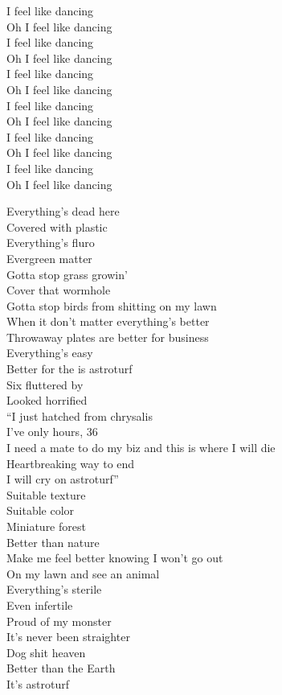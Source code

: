 I feel like dancing \\
Oh I feel like dancing \\
I feel like dancing \\
Oh I feel like dancing \\
I feel like dancing \\
Oh I feel like dancing \\
I feel like dancing \\
Oh I feel like dancing \\
I feel like dancing \\
Oh I feel like dancing \\
I feel like dancing \\
Oh I feel like dancing \\




Everything's dead here \\
Covered with plastic \\
Everything's fluro \\
Evergreen matter \\
Gotta stop grass growin' \\
Cover that wormhole \\
Gotta stop birds from shitting on my lawn \\
When it don't matter everything's better \\
Throwaway plates are better for business \\
Everything's easy \\
Better for the  is astroturf \\

Six  fluttered by \\
Looked horrified \\
``I just hatched from chrysalis \\
I've only hours, 36 \\
I need a mate to do my biz and this is where I will die \\
Heartbreaking way to end \\
I will cry on astroturf'' \\

Suitable texture \\
Suitable color \\
Miniature forest \\
Better than nature \\
Make me feel better knowing I won't go out \\
On my lawn and see an animal \\
Everything's sterile \\
Even infertile \\
Proud of my monster \\
It's never been straighter \\
Dog shit heaven \\
Better than the Earth \\
It's astroturf \\

